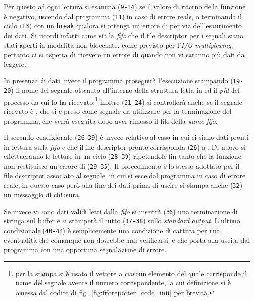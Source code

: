Per questo ad ogni lettura si esamina (\texttt{\small 9-14}) se il valore di
ritorno della funzione  è negativo, uscendo dal programma
(\texttt{\small 11}) in caso di errore reale, o terminando il ciclo
(\texttt{\small 13}) con un \texttt{break} qualora si ottenga un errore di
 per via dell'esaurimento dei dati. Si ricordi infatti come
sia la \textit{fifo} che il file descriptor per i segnali siano stati aperti in
modalità non-bloccante, come previsto per l’\textit{I/O multiplexing},
pertanto ci si aspetta di ricevere un errore di  quando non vi
saranno più dati da leggere.

In presenza di dati invece il programma proseguirà l'esecuzione stampando
(\texttt{\small 19-20}) il nome del segnale ottenuto all'interno della
struttura  letta in  ed il \textit{pid}
del processo da cui lo ha ricevuto;\footnote{per la stampa si è usato il
  vettore  a ciascun elemento del quale corrisponde il nome
  del segnale avente il numero corrispondente, la cui definizione si è omessa
  dal codice di fig.~\ref{fig:fiforeporter_code_init} per brevità.} inoltre
(\texttt{\small 21-24}) si controllerà anche se il segnale ricevuto è
, che si è preso come segnale da utilizzare per la terminazione
del programma, che verrà eseguita dopo aver rimosso il file della \textit{name
  fifo}.
 
Il secondo condizionale (\texttt{\small 26-39}) è invece relativo al caso in
cui ci siano dati pronti in lettura sulla \textit{fifo} e che il file
descriptor pronto corrisponda (\texttt{\small 26}) a . Di nuovo si
effettueranno le letture in un ciclo (\texttt{\small 28-39}) ripetendole fin
tanto che la funzione  non restituisce un errore di
 (\texttt{\small 29-35}). Il procedimento è lo stesso adottato
per il file descriptor associato al segnale, in cui si esce dal programma in
caso di errore reale, in questo caso però alla fine dei dati prima di uscire
si stampa anche (\texttt{\small 32}) un messaggio di chiusura.

Se invece vi sono dati validi letti dalla \textit{fifo} si inserirà
(\texttt{\small 36}) una terminazione di stringa sul buffer e si stamperà il
tutto (\texttt{\small 37-38}) sullo \textit{standard output}. L'ultimo
condizionale (\texttt{\small 40-44}) è semplicemente una condizione di cattura
per una eventualità che comunque non dovrebbe mai verificarsi, e che porta
alla uscita dal programma con una opportuna segnalazione di errore.

